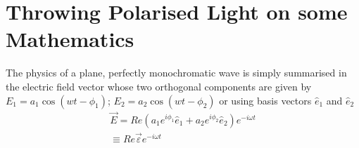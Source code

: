 \chapter[Throwing Polarised Light on some Mathematics]{Throwing Polarised Light on some Mathematics}\label{chap13}



The physics of a plane, perfectly monochromatic wave is simply summarised
in the electric field vector whose two orthogonal components are given by
$E_1 = a_1 \cos(wt - \phi_1)$; $E_2 = a_2 \cos(wt - \phi_2)$ or using basis vectors $\hat{e}_1$ and $\hat{e}_2$
\begin{gather*}
\overrightarrow{E} = Re (a_1 e^{i \phi_1 } \hat{e}_1 + a_2 e^{i\phi_2} \hat{e}_2 ) e^{-i\omega t} \\
\equiv Re \overrightarrow{\varepsilon} e^{-i\omega t}
\end{gather*}

